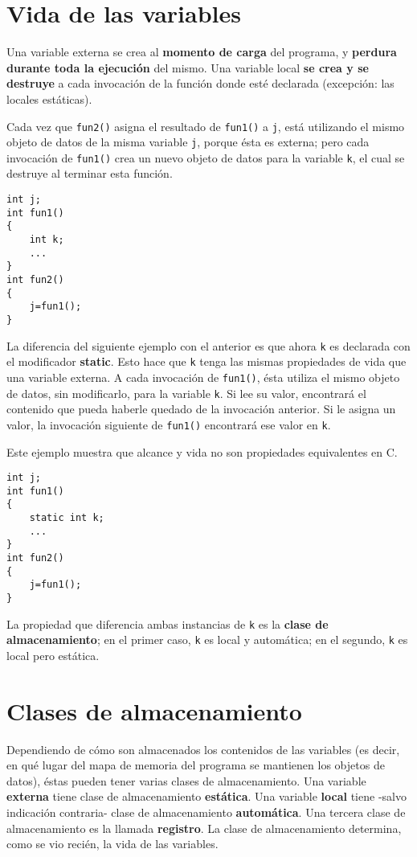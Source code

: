 \section{Vida de las variables}

Una variable externa se crea al \textbf{momento de carga} del programa, y \textbf{perdura durante toda la ejecución}
del mismo. Una variable local \textbf{se crea y se destruye} a cada invocación de la función donde esté
declarada (excepción: las locales estáticas).

\begin{ejemplo}
Cada vez que \lstinline{fun2()} asigna el resultado de \lstinline{fun1()} a \lstinline{j}, está utilizando el mismo objeto de datos de la misma variable \lstinline{j}, porque ésta es externa; pero cada invocación de \lstinline{fun1()} crea un nuevo objeto de datos para la variable \lstinline{k}, el cual se destruye al terminar esta función.
\begin{lstlisting}
int j;
int fun1()
{
	int k;
	...
}
int fun2()
{
	j=fun1();
}
\end{lstlisting}
\end{ejemplo}

\begin{ejemplo}
La diferencia del siguiente ejemplo con el anterior es que ahora \lstinline{k} es declarada con el modificador \textbf{static}. Esto hace que \lstinline{k} tenga las mismas propiedades de vida que una variable externa. A cada invocación de \lstinline{fun1()},
ésta utiliza el mismo objeto de datos, sin modificarlo, para la variable \lstinline{k}. Si lee su valor, encontrará el
contenido que pueda haberle quedado de la invocación anterior. Si le asigna un valor, la invocación siguiente de \lstinline{fun1()}
encontrará ese valor en \lstinline{k}. 

Este ejemplo muestra que alcance y vida no son propiedades equivalentes en
C. 
\begin{lstlisting}
int j;
int fun1()
{
	static int k;
	...
}
int fun2()
{
	j=fun1();
}
\end{lstlisting}
La propiedad que diferencia ambas instancias de \lstinline{k} es la \textbf{clase de almacenamiento}; en el primer caso,
\lstinline{k} es local y automática; en el segundo, \lstinline{k} es local pero estática. 
\end{ejemplo}


\section{Clases de almacenamiento}
Dependiendo de cómo son almacenados los contenidos de las variables (es decir, en qué lugar del mapa de memoria del programa se mantienen los objetos de datos), éstas pueden tener varias clases de almacenamiento. Una variable \textbf{externa} tiene clase de almacenamiento \textbf{estática}. Una variable \textbf{local} tiene -salvo indicación contraria- clase de almacenamiento \textbf{automática}. Una tercera clase de almacenamiento es la llamada \textbf{registro}. La clase de almacenamiento determina, como se vio recién, la vida de las variables.

